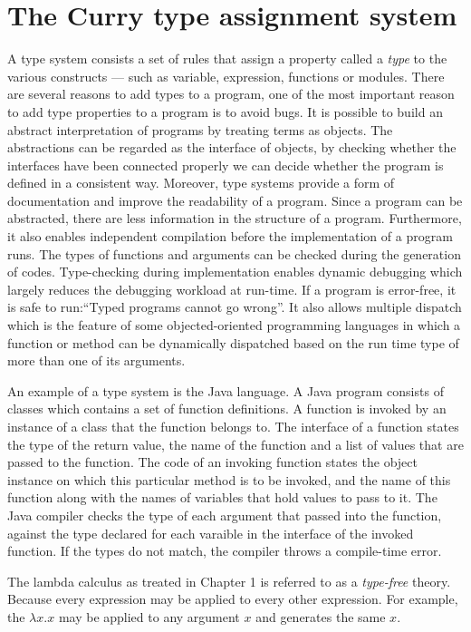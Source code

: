 \chapter{The Curry type assignment system}

A type system consists a set of rules that assign a property called a \textit{type} to the various constructs --- such as variable, expression, functions or modules. There are several reasons to add types to a program, one of the most important reason to add type properties to a program is to avoid bugs. It is possible to build an abstract interpretation of programs by treating terms as objects. The abstractions can be regarded as the interface of objects, by checking whether the interfaces have been connected properly we can decide whether the program is defined in a consistent way. Moreover, type systems provide a form of documentation and improve the readability of a program. Since a program can be abstracted, there are less information in the structure of a program. Furthermore, it also enables independent compilation before the implementation of a program runs. The types of functions and arguments can be checked during the generation of codes. Type-checking during implementation enables dynamic  debugging which largely reduces the debugging workload at run-time. If a program is error-free, it is safe to run:``Typed programs cannot go wrong''. It also allows multiple dispatch which is the feature of some objected-oriented programming languages in which a function or method can be dynamically dispatched based on the run time type of more than one of its arguments.
 
An example of a type system is the Java language. A Java program consists of classes which contains a set of function definitions. A function is invoked by an instance of a class that the function belongs to. The interface of a function states the type of the return value, the name of the function and a list of values that are passed to the function. The code of an invoking function states the object instance on which this particular method is to be invoked, and the name of this function along with the names of variables that hold values to pass to it. The Java compiler checks the type of each argument that passed into the function, against the type declared for each varaible in the interface of the invoked function. If the types do not match, the compiler throws a compile-time error.

The lambda calculus as treated in Chapter 1 is referred to as a \textit{type-free} theory. Because every expression may be applied to every other expression. For example, the $\lambda x.x$ may be applied to any argument $x$ and generates the same $x$. 

